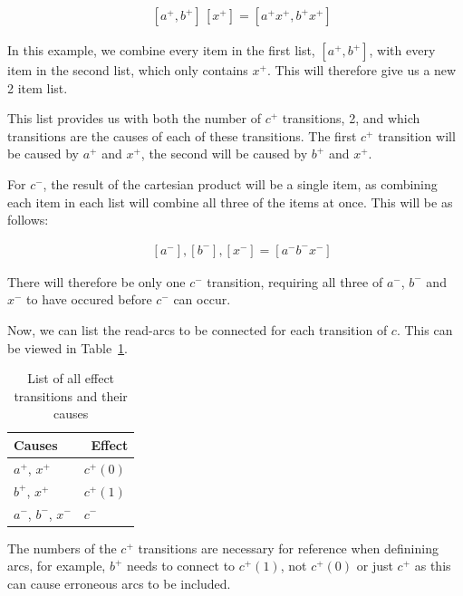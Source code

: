 \documentclass[british,conference,compsoc]{IEEEtran}
\begin{document}
\[
\begin{array}{lcl}
~&[a^{+}, b^{+}]\, [x^{+}] = [a^{+} x^{+}, b^{+} x^{+}]
\end{array}
\]

\noindent In this example, we combine every item in the first list,
$[a^{+}, b^{+}]$, with every item in the second list, which only 
contains $x^{+}$. This will therefore give us a new 2 item list. 

This list provides us with both the number of $c^{+}$ transitions,
2, and which transitions are the causes of each of these transitions.
The first $c^{+}$ transition will be caused by $a^{+}$ and $x^{+}$,
the second will be caused by $b^{+}$ and $x^{+}$. 

For $c^{-}$, the result of the cartesian product will be a single item,
as combining each item in each list will combine all three of the items 
at once. This will be as follows:

\[
\begin{array}{lcl}
~&[a^{-}], [b^{-}], [x^{-}]  = [a^{-} b^{-} x^{-}]
\end{array}
\]

\noindent There will therefore be only one $c^{-}$ transition, requiring all three
of $a^{-}$, $b^{-}$ and $x^{-}$ to have occured before $c^{-}$
can occur. 

Now, we can list the read-arcs to be connected for each transition of $c$.
This can be viewed in Table~\ref{tab:list-by-transition}.

\begin{table}[h]
\caption{List of all effect transitions and their causes\label{tab:list-by-transition}}

  \centering
\begin{tabular}[htb]{| m{2.6cm} | m{2.0cm} |}
  \hline
Causes & \, Effect \\ \hline \hline
$a^{+}$, $x^{+}$ & $c^{+}(0)$ \\ \hline
$b^{+}$, $x^{+}$ & $c^{+}(1)$ \\ \hline
$a^{-}$, $b^{-}$, $x^{-}$ & $c^{-}$ \\ \hline
  \end{tabular}
\end{table}

The numbers of the $c^{+}$ transitions are necessary for reference
when definining arcs, for example, $b^{+}$ needs to connect to 
$c^{+}(1)$, not $c^{+}(0)$ or just $c^{+}$ as this can cause 
erroneous arcs to be included. 
\end{document}
